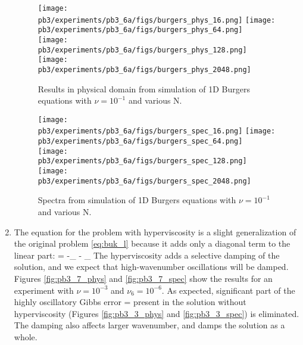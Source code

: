 \documentclass[11pt]{article}
\def\hatgap{2pt}
\def\subdown{-2pt}
\newcommand\what[2][]{%
\renewcommand\stackalignment{l}%
\stackon[\hatgap]{#2}{%
\stretchto{%
    \scalerel*[\widthof{$#2$}]{\kern-.6pt\bigwedge\kern-.6pt}%
    {\rule[-\textheight/2]{1ex}{\textheight}}%
}{0.5ex}%
_{\smash{\belowbaseline[\subdown]{\scriptstyle#1}}}%
}}
\begin{document}
\begin{enumerate}
    \begin{figure}[ht]
    \begin{center}
    \texttt{[image: pb3/experiments/pb3\_6a/figs/burgers\_phys\_16.png]} 
    \texttt{[image: pb3/experiments/pb3\_6a/figs/burgers\_phys\_64.png]}\\
    \texttt{[image: pb3/experiments/pb3\_6a/figs/burgers\_phys\_128.png]}
    \texttt{[image: pb3/experiments/pb3\_6a/figs/burgers\_phys\_2048.png]}
    \end{center}
    \caption{Results in physical domain from simulation of 1D Burgers equations with $\nu = 10^{-1}$ and various N.}
    \label{fig:pb3_6b_phys}
    \end{figure}


    \begin{figure}[ht]
    \begin{center}
    \texttt{[image: pb3/experiments/pb3\_6a/figs/burgers\_spec\_16.png]} 
    \texttt{[image: pb3/experiments/pb3\_6a/figs/burgers\_spec\_64.png]}\\
    \texttt{[image: pb3/experiments/pb3\_6a/figs/burgers\_spec\_128.png]}
    \texttt{[image: pb3/experiments/pb3\_6a/figs/burgers\_spec\_2048.png]}
    \end{center}
    \caption{Spectra from simulation of 1D Burgers equations with $\nu = 10^{-1}$ and various N.}
    \label{fig:pb3_6b_spec}
    \end{figure}


\item The equation for the problem with hyperviscosity is a slight generalization of the original problem \eqref{eq:buk_l} because it adds only a diagonal term to the linear part:
    \beq
    \label{eq:bur_k_2}
    \frac{\dd \what{u}_k}{\dd t} = -\underbrace{ \what{(u\p_x u)}_k}_{\Nu} - \underbrace{(\nu k^2 + \nu_6 k^6 )\what{u}_k}_{\Lu}\per
    \eeq
    The hyperviscosity adds a selective damping of the solution, and we expect that high-wavenumber oscillations will be damped. Figures \ref{fig:pb3_7_phys}  and \ref{fig:pb3_7_spec} show the results for an experiment with $\nu=10^{-3}$ and $\nu_6 = 10^{-6}$. As expected, significant part of the highly oscillatory Gibbs error = present in the solution without hyperviscosity (Figures  \ref{fig:pb3_3_phys} and  \ref{fig:pb3_3_spec}) is eliminated. The damping also affects  larger wavenumber, and damps the solution as a whole.


\end{enumerate}
\end{document}
